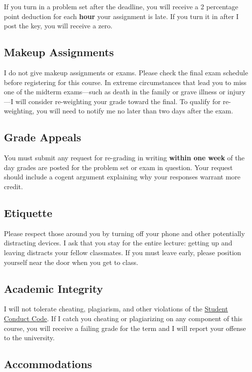 \documentclass[11pt]{article}
\begin{document}
If you turn in a problem set after the deadline, you will receive a 2 percentage point deduction for each \textbf{hour} your assignment is late. If you turn it in after I post the key, you will receive a zero.

\subsection*{Makeup Assignments} 

I do not give makeup assignments or exams. Please check the final exam schedule before registering for this course. In extreme circumstances that lead you to miss one of the midterm exams---such as death in the family or grave illness or injury---I will consider re-weighting your grade toward the final. To qualify for re-weighting, you will need to notify me no later than two days after the exam.

\subsection*{Grade Appeals} 

You must submit any request for re-grading in writing \textbf{within one week} of the day grades are posted for the problem set or exam in question. Your request should include a cogent argument explaining why your responses warrant more credit.

\subsection*{Etiquette} 

Please respect those around you by turning off your phone and other potentially distracting devices. I ask that you stay for the entire lecture: getting up and leaving distracts your fellow classmates. If you must leave early, please position yourself near the door when you get to class. 

\subsection*{Academic Integrity} 

I will not tolerate cheating, plagiarism, and other violations of the \href{https://studentlife.uoregon.edu/conduct}{Student Conduct Code}. If I catch you cheating or plagiarizing on any component of this course, you will receive a failing grade for the term and I will report your offense to the university. 

\subsection*{Accommodations} 
\end{document}
